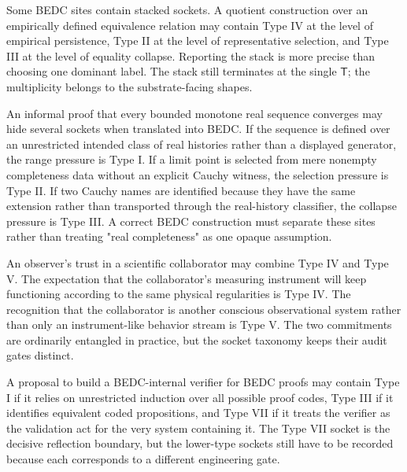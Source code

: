 \begin{remark}
\label{rem:transcendental-supply-stacked-sockets}
Some BEDC sites contain stacked sockets. A quotient construction over an empirically defined equivalence relation may contain Type IV at the level of empirical persistence, Type II at the level of representative selection, and Type III at the level of equality collapse. Reporting the stack is more precise than choosing one dominant label. The stack still terminates at the single $\mathsf{T}$; the multiplicity belongs to the substrate-facing shapes.
\end{remark}

\begin{example}
\label{ex:transcendental-supply-analysis-stack}
An informal proof that every bounded monotone real sequence converges may hide several sockets when translated into BEDC. If the sequence is defined over an unrestricted intended class of real histories rather than a displayed generator, the range pressure is Type I. If a limit point is selected from mere nonempty completeness data without an explicit Cauchy witness, the selection pressure is Type II. If two Cauchy names are identified because they have the same extension rather than transported through the real-history classifier, the collapse pressure is Type III. A correct BEDC construction must separate these sites rather than treating "real completeness" as one opaque assumption.
\end{example}

\begin{example}
\label{ex:transcendental-supply-observer-stack}
An observer's trust in a scientific collaborator may combine Type IV and Type V. The expectation that the collaborator's measuring instrument will keep functioning according to the same physical regularities is Type IV. The recognition that the collaborator is another conscious observational system rather than only an instrument-like behavior stream is Type V. The two commitments are ordinarily entangled in practice, but the socket taxonomy keeps their audit gates distinct.
\end{example}

\begin{example}
\label{ex:transcendental-supply-reflection-stack}
A proposal to build a BEDC-internal verifier for BEDC proofs may contain Type I if it relies on unrestricted induction over all possible proof codes, Type III if it identifies equivalent coded propositions, and Type VII if it treats the verifier as the validation act for the very system containing it. The Type VII socket is the decisive reflection boundary, but the lower-type sockets still have to be recorded because each corresponds to a different engineering gate.
\end{example}


